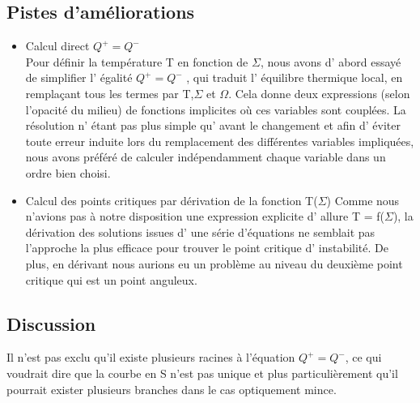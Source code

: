 \subsection{Pistes d'améliorations}

\begin{itemize}

\item Calcul direct $Q^+ = Q^-$
\\
Pour définir la température T en fonction de $\Sigma$, nous avons d' abord essayé de simplifier l' égalité $Q^+ = Q^-$ , qui traduit l' équilibre thermique local, en remplaçant tous les termes par T,$\Sigma$ et $\Omega$. Cela donne deux expressions (selon l'opacité du milieu) de fonctions implicites où ces variables sont couplées.
La résolution n' étant pas plus simple qu' avant le changement et afin d' éviter toute erreur induite lors du remplacement des différentes variables impliquées, nous avons préféré de calculer indépendamment chaque variable dans un ordre bien choisi. 
\\

\item Calcul des points critiques par dérivation de la fonction T($\Sigma$)
Comme nous n'avions pas à notre disposition une expression explicite d' allure T = f($\Sigma$), la dérivation des solutions issues d' une série d'équations ne semblait pas l'approche la plus efficace pour trouver le point critique d' instabilité. De plus, en dérivant nous aurions eu un problème au niveau du deuxième point critique qui est un point anguleux.
\end{itemize}

\subsection{Discussion}
Il n'est pas exclu qu'il existe plusieurs racines à l'équation $Q^+ = Q^-$, ce qui voudrait dire que la courbe en S n'est pas unique et plus particulièrement qu'il pourrait exister plusieurs branches dans le cas optiquement mince.